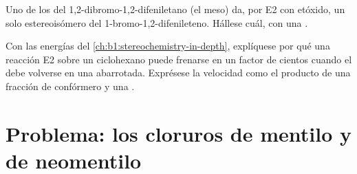 \begin{exercise}[$\star\star\star$]\label{exo:b1:elimination:11}
Uno de los  del 1,2-dibromo-1,2-difeniletano (el meso)
da, por E2 con etóxido, un solo estereoisómero del
1-bromo-1,2-difenileteno. Hállese cuál, con una .
\end{exercise}

\begin{exercise}[$\star\star\star$]\label{exo:b1:elimination:12}
Con las energías del \cref{ch:b1:stereochemistry-in-depth}, explíquese
por qué una reacción E2 sobre un ciclohexano puede frenarse en un factor
de cientos cuando el  debe volverse  en una 
abarrotada. Exprésese la velocidad como el producto de una fracción de
confórmero y una .
\end{exercise}

\section{Problema: los cloruros de mentilo y de neomentilo}

